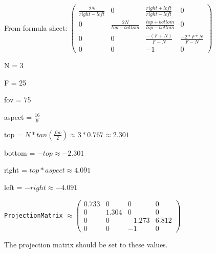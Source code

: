 From formula sheet: $
    \left(\begin{array}{cccc}
        \frac{2N}{right-left} & 0 & \frac{right + left}{right - left} & 0 \\
        0 & \frac{2N}{top - bottom} & \frac{top + bottom}{top - bottom} & 0 \\
        0 & 0 & \frac{-(F + N)}{F - N} & \frac{-2 * F * N}{F - N} \\
        0 & 0 & -1 & 0
    \end{array}\right)
$

N = 3

F = 25

fov = 75

aspect = $\frac{16}{9}$

top = $ N * tan\left(\frac{fov}{2}\right) \approx 3 * 0.767 \approx 2.301 $

bottom = $ -top \approx -2.301$

right = $top * aspect \approx 4.091$

left = $-right \approx -4.091$

\texttt{ProjectionMatrix}
$
\approx
    \left(\begin{array}{cccc}
        0.733 & 0 & 0 & 0 \\
        0 & 1.304 & 0 & 0 \\
        0 & 0 & -1.273 & 6.812 \\
        0 & 0 & -1 & 0
    \end{array}\right)
$

The projection matrix should be set to these values.
